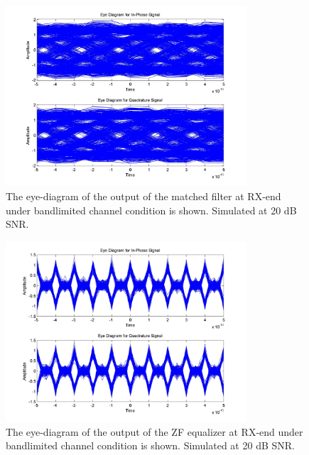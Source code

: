 \documentclass[]{article}
\begin{document}
\begin{figure}[H]
\centering
\includegraphics[width=0.8\textwidth]{matched_eye_qpsk20.jpg}
\caption{The eye-diagram of the output of the matched filter at RX-end under bandlimited channel condition is shown. Simulated at 20 dB SNR. \label{fig:qpEyeMatch}}
\end{figure}

\begin{figure}[H]
\centering
\includegraphics[width=0.8\textwidth]{awgn_eye_qpsk20.jpg}
\caption{ The eye-diagram of the output of the ZF equalizer at RX-end under bandlimited channel condition is shown. Simulated at 20 dB SNR.\label{fig:qpEyeEqu}}
\end{figure}
\end{document}
